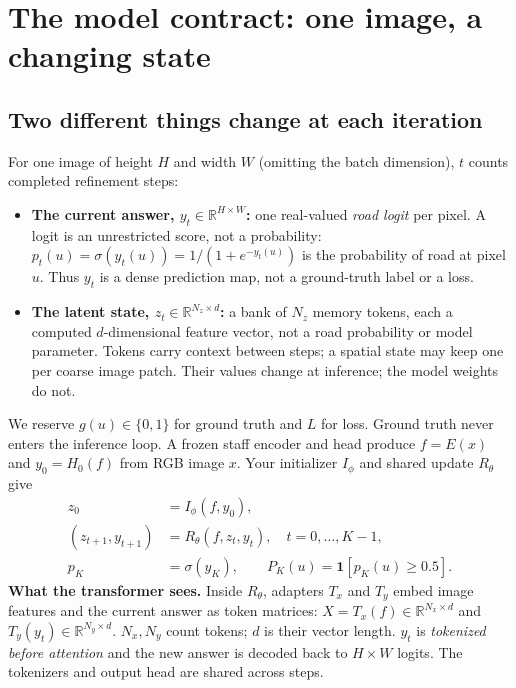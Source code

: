 \documentclass[11pt,letterpaper]{article}
\newcommand{\page}[1]{\clearpage\section{#1}}
\newcommand{\R}{\mathbb{R}}
\newcommand{\ind}{\mathbf{1}}
\begin{document}
\page{The model contract: one image, a changing state}
\subsection{Two different things change at each iteration}
For one image of height $H$ and width $W$ (omitting the batch dimension), $t$ counts completed refinement steps:
\begin{itemize}
\item \textbf{The current answer, $y_t\in\R^{H\times W}$:} one real-valued \emph{road logit} per pixel. A logit is an unrestricted score, not a probability: $p_t(u)=\sigma(y_t(u))=1/(1+e^{-y_t(u)})$ is the probability of road at pixel $u$. Thus $y_t$ is a dense prediction map, not a ground-truth label or a loss.
\item \textbf{The latent state, $z_t\in\R^{N_z\times d}$:} a bank of $N_z$ memory tokens, each a computed $d$-dimensional feature vector, not a road probability or model parameter. Tokens carry context between steps; a spatial state may keep one per coarse image patch. Their values change at inference; the model weights do not.
\end{itemize}
We reserve $g(u)\in\{0,1\}$ for ground truth and $L$ for loss. Ground truth never enters the inference loop. A frozen staff encoder and head produce $f=E(x)$ and $y_0=H_0(f)$ from RGB image $x$. Your initializer $I_\phi$ and shared update $R_\theta$ give
\begin{align}
 z_0 &= I_\phi(f,y_0),\\
 (z_{t+1},y_{t+1}) &= R_\theta(f,z_t,y_t),\quad t=0,\ldots,K-1,\label{eq:recurrence}\\
 p_K &= \sigma(y_K),\qquad P_K(u)=\ind[p_K(u)\geq0.5].
\end{align}
\textbf{What the transformer sees.} Inside $R_\theta$, adapters $T_x$ and $T_y$ embed image features and the current answer as token matrices: $X=T_x(f)\in\R^{N_x\times d}$ and $T_y(y_t)\in\R^{N_y\times d}$. $N_x,N_y$ count tokens; $d$ is their vector length. $y_t$ is \emph{tokenized before attention} and the new answer is decoded back to $H\times W$ logits. The tokenizers and output head are shared across steps.
\end{document}
